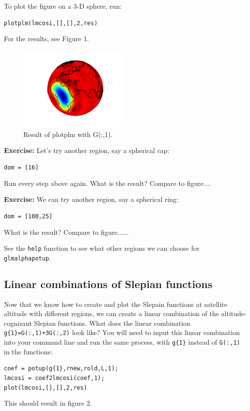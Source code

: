 \documentclass[11pt]{article}
\begin{document}
To plot the figure on a 3-D sphere, run:

\verb+plotplm(lmcosi,[],[],2,res)+

For the results, see Figure 1.
\begin{figure}
  \centering
  \includegraphics[width=0.5\textwidth]{ch3plot.png}
  \caption{Result of plotplm with G(:,1).}
\label{plotplm}
\end{figure}

\textbf{Exercise:} Let's try another region, say a spherical cap:

\verb+dom = [16]+

Run every step above again.  What is the result?  Compare to figure....

\textbf{Exercise:} We can try another region, say a spherical ring:

\verb+dom = [100,25]+

What is the result? Compare to figure......

See the \verb+help+ function to see what other regions we can choose for \verb+glmalphapotup+.

\subsection{Linear combinations of Slepian functions}

Now that we know how to create and plot the Slepain functions at satellite altitude with different regions, we can create a linear combination of the altitude-cognizant Slepian functions.  What does the linear combination \verb|g{1}=G(:,1)+3G(:,2)| look like?  You will need to input this linear combination into your command line and run the same process, with \verb+g{1}+ instead of \verb+G(:,1)+ in the functions:

\verb+coef = potup(g{1},rnew,rold,L,1);+\\
\verb+lmcosi = coef2lmcosi(coef,1);+\\
\verb+plot(lmcosi,[],[],2,res)+

This should result in figure 2.
\end{document}

